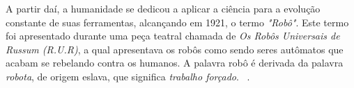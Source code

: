 	A partir daí, a humanidade se dedicou a aplicar a ciência para a evolução constante de suas ferramentas, alcançando em 1921, o termo \textit{"Robô"}. Este termo foi apresentado durante uma peça teatral chamada de \textit{Os Robôs Universais de Russum (R.U.R)}, a qual apresentava os robôs como sendo seres autômatos que acabam se rebelando contra os humanos. A palavra robô é derivada da palavra \textit{robota}, de origem eslava, que significa \textit{trabalho forçado}. ~\cite{roboticaIndustrial}.